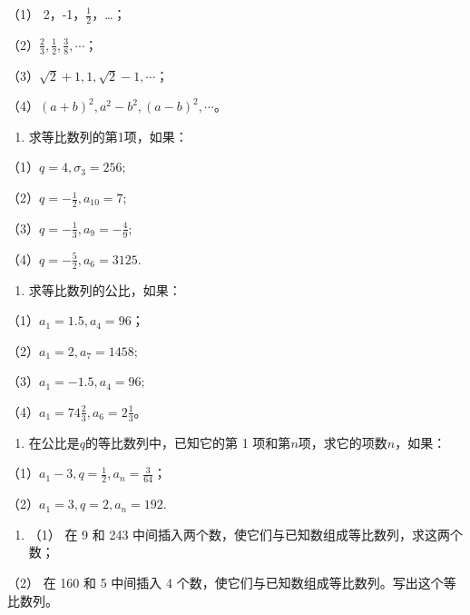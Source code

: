 （1） 2，-1，\(\frac{1}{2}\)，\ldots；

（2）\(\frac{2}{3}, \frac{1}{2}, \frac{3}{8}, \cdots\)；

（3）\(\sqrt{2} + 1, 1, \sqrt{2} - 1, \cdots\)；

（4）\((a + b)^2, a^2 - b^2, (a - b)^2, \cdots\)。

\begin{enumerate}[start=2]
\item
  求等比数列的第1项，如果：
\end{enumerate}

（1）\(q = 4, \sigma_{3} = 256;\)

（2）\(q = -\frac{1}{2}, a_{10} = 7;\)

（3）\(q = -\frac{1}{3}, a_{9} = -\frac{4}{9};\)

（4）\(q = -\frac{5}{2}, a_{6} = 3125.\)

\begin{enumerate}[start=3]
\item
  求等比数列的公比，如果：
\end{enumerate}

（1）\(a_{1} = 1.5, a_{4} = 96\)；

（2）\(a_{1} = 2, a_{7} = 1458;\)

（3）\(a_{1} = -1.5, a_{4} = 96;\)

（4）\(a_{1} = 74\frac{2}{3}, a_{6} = 2\frac{1}{3}\)。

\begin{enumerate}[start=4]
\item
  在公比是\(q\)的等比数列中，已知它的第 1
  项和第\(n\)项，求它的项数\(n\)，如果：
\end{enumerate}

（1）\(a_{1} - 3, q = \frac{1}{2}, a_{n} = \frac{3}{64}\)；

（2）\(a_{1} = 3, q = 2, a_{n} = 192.\)

\begin{enumerate}[start=5]
\item
  （1） 在 9 和 243
  中间插入两个数，使它们与已知数组成等比数列，求这两个数；
\end{enumerate}

（2） 在 160 和 5 中间插入 4
个数，使它们与已知数组成等比数列。写出这个等比数列。

